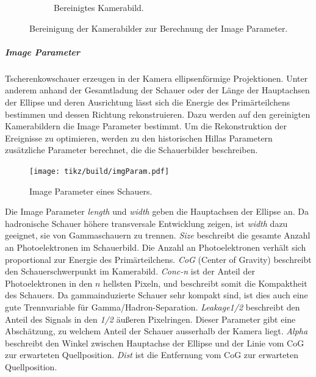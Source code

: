 \begin{figure}[ht]
\begin{subfigure}[c]{0.35\linewidth}
    \caption{Bereinigtes Kamerabild.}%
    \label{fig:cleaned}
  \end{subfigure}
  \caption{Bereinigung der Kamerabilder zur Berechnung der Image Parameter.}%
  \label{fig:cleaning}
\end{figure}

\subparagraph{Image Parameter}%
\label{spar:image_parameter}

Tscherenkowschauer erzeugen in der Kamera ellipsenförmige Projektionen.
Unter anderem anhand der Gesamtladung der Schauer 
oder der Länge der Hauptachsen der Ellipse 
und deren Ausrichtung lässt sich die Energie 
des Primärteilchens bestimmen und dessen Richtung rekonstruieren.
Dazu werden auf den gereinigten Kamerabildern die Image Parameter bestimmt.
Um die Rekonstruktion der Ereignisse zu optimieren, 
werden zu den historischen Hillas Parametern zusätzliche Parameter berechnet, 
die die Schauerbilder beschreiben.


\begin{figure}
  \centering
  \texttt{[image: tikz/build/imgParam.pdf]}
  \caption{Image Parameter eines Schauers.}%
  \label{fig:hillas}
\end{figure}

Die Image Parameter \textit{length} und \textit{width} geben die Hauptachsen
der Ellipse an.
Da hadronische Schauer höhere transversale Entwicklung zeigen, ist
\textit{width} dazu geeignet, sie von Gammaschauern zu trennen.
\textit{Size} beschreibt die gesamte Anzahl an Photoelektronen im Schauerbild.
Die Anzahl an Photoelektronen verhält sich proportional zur Energie des
Primärteilchens.
\textit{CoG} (Center of Gravity) beschreibt den Schauerschwerpunkt im Kamerabild.
\textit{Conc-n} ist der Anteil der Photoelektronen in den $n$ hellsten Pixeln,
und beschreibt somit die Kompaktheit des Schauers.
Da gammainduzierte Schauer sehr kompakt sind, ist dies auch eine gute
Trennvariable für Gamma/Hadron-Separation.
\textit{Leakage1/2} beschreibt den Anteil des Signals in den \textit{1/2} äußeren
Pixelringen.
Dieser Parameter gibt eine Abschätzung,
zu welchem Anteil der Schauer ausserhalb der Kamera liegt.
\textit{Alpha} beschreibt den Winkel zwischen Hauptachse der Ellipse und
der Linie vom CoG zur erwarteten Quellposition.
\textit{Dist} ist die Entfernung vom CoG zur erwarteten Quellposition.
